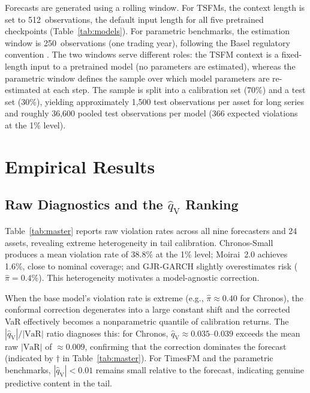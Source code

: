 \documentclass[preprint,11pt,authoryear]{elsarticle}
\newcommand{\VaR}{\mathrm{VaR}}
\newcommand{\1}{\boldsymbol{1}}
\newcommand{\qV}{\hat{q}_{\scriptscriptstyle\mathrm{V}}}
\begin{document}
	Forecasts are generated using a rolling window. For
	TSFMs, the context length is set to 512~observations,
	the default input length for all five pretrained
	checkpoints (Table~\ref{tab:models}). For parametric
	benchmarks, the estimation window is 250~observations
	(one trading year), following the Basel regulatory
	convention
	\citep{basel1996}.
	The two windows serve different roles: the TSFM
	context is a fixed-length input to a pretrained model
	(no parameters are estimated), whereas the parametric
	window defines the sample over which model parameters
	are re-estimated at each step. The sample is split into a calibration set (70\%) and
	a test set (30\%), yielding approximately 1,500 test
	observations per asset for long series and roughly 36,600
	pooled test observations per model (366 expected violations
	at the 1\% level).
	
	\section{Empirical Results}
	\label{sec:results}
	
	\subsection{Raw Diagnostics and the $\qV$ Ranking}
	\label{sec:results_raw}
	\label{sec:diagnostic}
	
	Table~\ref{tab:master} reports raw violation rates across all
	nine forecasters and 24 assets, revealing extreme heterogeneity
	in tail calibration. Chronos-Small produces a mean violation
	rate of 38.8\% at the 1\% level; Moirai~2.0 achieves 1.6\%,
	close to nominal coverage; and GJR-GARCH slightly overestimates
	risk ($\hat\pi = 0.4$\%). This heterogeneity motivates a
	model-agnostic correction.
	
	When the base model's violation rate is extreme (e.g.,
	$\hat\pi \approx 0.40$ for Chronos), the conformal correction
	degenerates into a large constant shift and the corrected VaR
	effectively becomes a nonparametric quantile of calibration
	returns. The $|\qV|/|\VaR|$ ratio diagnoses this: for
	Chronos, $\qV \approx 0.035$--$0.039$ exceeds the mean raw
	$|\VaR|$ of $\approx 0.009$, confirming that the correction
	dominates the forecast (indicated by $\dagger$ in
	Table~\ref{tab:master}). For TimesFM and the parametric
	benchmarks, $|\qV| < 0.01$ remains small relative to the
	forecast, indicating genuine predictive content in the tail.
	
\end{document}

